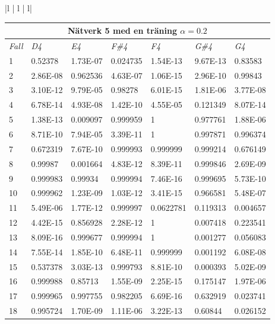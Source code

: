 \documentclass[a4paper,10pt]{article}
\begin{document}
{\begin{tabular}{ |l | l | l| }
\begin{centering}
\begin{centering}
{\begin{tabular}{ |l|l|l|l|l|l|l| }
\hline
\multicolumn{7}{|c|}{Nätverk 5 med en träning $\alpha=0.2$}\\ \hline
\emph{Fall}        & \emph{D4}       & \emph{E4}        &\emph{F\#4}     & \emph{F4}        & \emph{G\#4}     & \emph{G4} \\ \hline
1 	        & 0.52378  & 1.73E-07  & 0.024735 &  1.54E-13 & 9.67E-13 & 0.83583  \\ \hline      
2 	        & 2.86E-08 & 0.962536  & 4.63E-07 &  1.06E-15 & 2.96E-10 & 0.99843  \\ \hline      
3 	        & 3.10E-12 & 9.79E-05  & 0.98278  &  6.01E-15 & 1.81E-06 & 3.77E-08 \\ \hline      
4 	        & 6.78E-14 & 4.93E-08  & 1.42E-10 &  4.55E-05 & 0.121349 & 8.07E-14 \\ \hline      
5 	        & 1.38E-13 & 0.009097  & 0.999959 &  1        & 0.977761 & 1.88E-06 \\ \hline      
6 	        & 8.71E-10 & 7.94E-05  & 3.39E-11 &  1        & 0.997871 & 0.996374 \\ \hline      
7 	        & 0.672319 & 7.67E-10  & 0.999993 &  0.999999 & 0.999214 & 0.676149 \\ \hline      
8 	        & 0.99987  & 0.001664  & 4.83E-12 &  8.39E-11 & 0.999846 & 2.69E-09 \\ \hline      
9 	        & 0.999983 & 0.99934   & 0.999994 &  7.46E-16 & 0.999695 & 5.73E-10 \\ \hline      
10	        & 0.999962 & 1.23E-09  & 1.03E-12 &  3.41E-15 & 0.966581 & 5.48E-07 \\ \hline      
11	        & 5.49E-06 & 1.77E-12  & 0.999997 &  0.0622781& 0.119313 & 0.004657 \\ \hline      
12	        & 4.42E-15 & 0.856928  & 2.28E-12 &  1        & 0.007418 & 0.223541 \\ \hline      
13	        & 8.09E-16 & 0.999677  & 0.999994 &  1        & 0.001277 & 0.056083 \\ \hline      
14	        & 7.55E-14 & 1.85E-10  & 6.48E-11 &  0.999999 & 0.001192 & 6.08E-08 \\ \hline      
15	        & 0.537378 & 3.03E-13  & 0.999793 &  8.81E-10 & 0.000393 & 5.02E-09 \\ \hline      
16	        & 0.999988 & 0.85713   & 1.55E-09 &  2.25E-15 & 0.175147 & 1.97E-06 \\ \hline      
17	        & 0.999965 & 0.997755  & 0.982205 &  6.69E-16 & 0.632919 & 0.023741 \\ \hline      
18	        & 0.995724 & 1.70E-09  & 1.11E-06 &  3.22E-13 & 0.60844  & 0.026152 \\ \hline      

\end{tabular}}
\end{centering}
\end{centering}
\end{tabular}}
\end{document}
